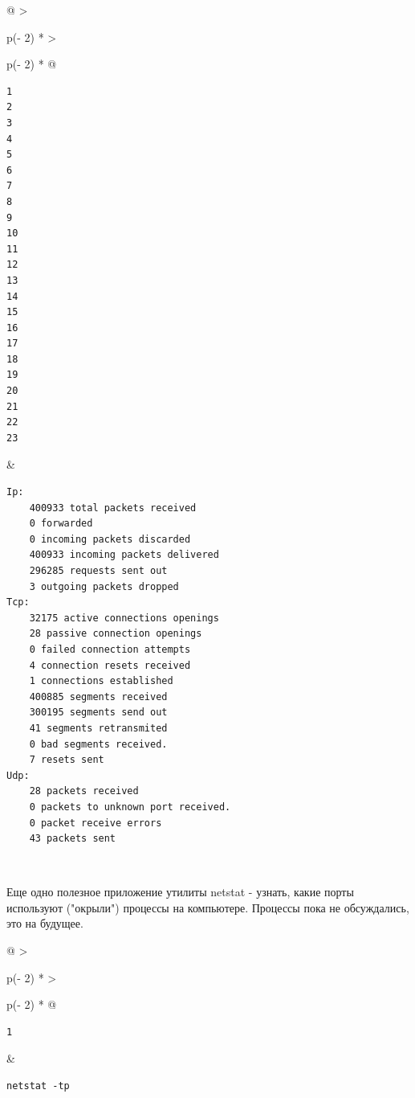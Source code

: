 \documentclass{article}
\begin{document}
\begin{longtable}[]{@{}
  >{\raggedright\arraybackslash}p{(\columnwidth - 2\tabcolsep) * }
  >{\raggedright\arraybackslash}p{(\columnwidth - 2\tabcolsep) * }@{}}
\toprule
\endhead
\begin{minipage}[t]{\linewidth}\raggedright
\begin{verbatim}
1
2
3
4
5
6
7
8
9
10
11
12
13
14
15
16
17
18
19
20
21
22
23
\end{verbatim}
\end{minipage} & \begin{minipage}[t]{\linewidth}\raggedright
\begin{verbatim}
Ip:
    400933 total packets received
    0 forwarded
    0 incoming packets discarded
    400933 incoming packets delivered
    296285 requests sent out
    3 outgoing packets dropped
Tcp:
    32175 active connections openings
    28 passive connection openings
    0 failed connection attempts
    4 connection resets received
    1 connections established
    400885 segments received
    300195 segments send out
    41 segments retransmited
    0 bad segments received.
    7 resets sent
Udp:
    28 packets received
    0 packets to unknown port received.
    0 packet receive errors
    43 packets sent
\end{verbatim}
\end{minipage} \\ \addlinespace
\bottomrule
\end{longtable}

Еще одно полезное приложение утилиты netstat - узнать, какие порты
используют ("окрыли") процессы на компьютере. Процессы пока не
обсуждались, это на будущее.

\begin{longtable}[]{@{}
  >{\raggedright\arraybackslash}p{(\columnwidth - 2\tabcolsep) * }
  >{\raggedright\arraybackslash}p{(\columnwidth - 2\tabcolsep) * }@{}}
\toprule
\endhead
\begin{minipage}[t]{\linewidth}\raggedright
\begin{verbatim}
1
\end{verbatim}
\end{minipage} & \begin{minipage}[t]{\linewidth}\raggedright
\begin{verbatim}
netstat -tp
\end{verbatim}
\end{minipage} \\ \addlinespace
\bottomrule
\end{longtable}
\end{document}
